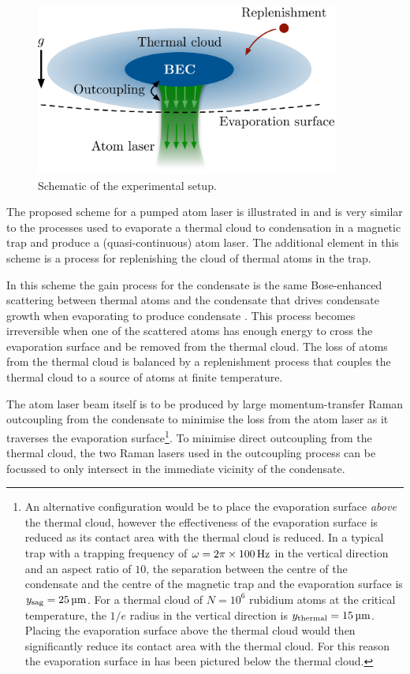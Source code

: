 \begin{figure}
    \centering
        \includegraphics[width=10cm]{QKTScheme}
    \caption{Schematic of the experimental setup.}
    \label{KineticTheory:QKTScheme}
\end{figure}

The proposed scheme for a pumped atom laser is illustrated in  and is very similar to the processes used to evaporate a thermal cloud to condensation in a magnetic trap and produce a (quasi-continuous) atom laser. The additional element in this scheme is a process for replenishing the cloud of thermal atoms in the trap.  

In this scheme the gain process for the condensate is the same Bose-enhanced scattering between thermal atoms and the condensate that drives condensate growth when evaporating to produce condensate \citep{Gardiner:1997kx,Davis:2000vn,Bijlsma:2000}.  This process becomes irreversible when one of the scattered atoms has enough energy to cross the evaporation surface and be removed from the thermal cloud.  The loss of atoms from the thermal cloud is balanced by a replenishment process that couples the thermal cloud to a source of atoms at finite temperature.

The atom laser beam itself is to be produced by large momentum-transfer Raman outcoupling from the condensate to minimise the loss from the atom laser as it traverses the evaporation surface\footnote{An alternative configuration would be to place the evaporation surface \emph{above} the thermal cloud, however the effectiveness of the evaporation surface is reduced as its contact area with the thermal cloud is reduced. In a typical trap with a trapping frequency of $\omega = 2\pi \times \unit[100]{Hz}$ in the vertical direction and an aspect ratio of $10$, the separation between the centre of the condensate and the centre of the magnetic trap and the evaporation surface is $y_\text{sag} = \unit[25]{\micro m}$.  For a thermal cloud of $N=10^6$ rubidium atoms at the critical temperature, the $1/e$ radius in the vertical direction is $y_\text{thermal} = \unit[15]{\micro m}$. Placing the evaporation surface above the thermal cloud would then significantly reduce its contact area with the thermal cloud. For this reason the evaporation surface in  has been pictured below the thermal cloud.}. To minimise direct outcoupling from the thermal cloud, the two Raman lasers used in the outcoupling process can be focussed to only intersect in the immediate vicinity of the condensate.

